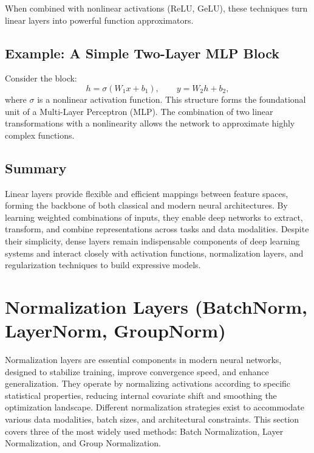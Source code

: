 \documentclass[12pt,a4paper]{report}
\begin{document}
When combined with nonlinear activations (ReLU, GeLU), these techniques turn linear layers into powerful function approximators.

\vspace{1em}
\subsection{Example: A Simple Two-Layer MLP Block}

Consider the block:
\[
h = \sigma(W_1 x + b_1), \qquad y = W_2 h + b_2,
\]
where $\sigma$ is a nonlinear activation function.  
This structure forms the foundational unit of a Multi-Layer Perceptron (MLP).  
The combination of two linear transformations with a nonlinearity allows the network to approximate highly complex functions.

\vspace{1em}
\subsection{Summary}

Linear layers provide flexible and efficient mappings between feature spaces, forming the backbone of both classical and modern neural architectures.  
By learning weighted combinations of inputs, they enable deep networks to extract, transform, and combine representations across tasks and data modalities.  
Despite their simplicity, dense layers remain indispensable components of deep learning systems and interact closely with activation functions, normalization layers, and regularization techniques to build expressive models.



\section{Normalization Layers (BatchNorm, LayerNorm, GroupNorm)}

Normalization layers are essential components in modern neural networks, designed to stabilize training, improve convergence speed, and enhance generalization. 
They operate by normalizing activations according to specific statistical properties, reducing internal covariate shift and smoothing the optimization landscape.  
Different normalization strategies exist to accommodate various data modalities, batch sizes, and architectural constraints.  
This section covers three of the most widely used methods: Batch Normalization, Layer Normalization, and Group Normalization.
\end{document}
